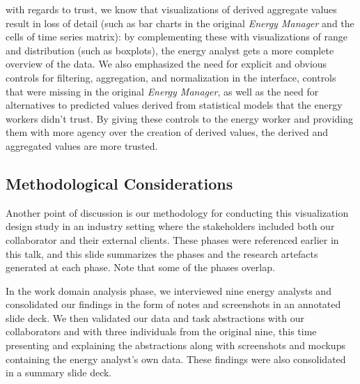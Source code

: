 \documentclass[journal]{vgtc}                %
\newcommand{\bstart}[1]{\vspace{1mm} \noindent{\textbf{#1:}}}
\begin{document}
\bstart{Trust} with regards to trust, we know that visualizations of derived aggregate values result in loss of detail (such as bar charts in the original {\it Energy Manager} and the cells of time series matrix): by complementing these with visualizations of range and distribution (such as boxplots), the energy analyst gets a more complete overview of the data.
We also emphasized the need for explicit and obvious controls for filtering, aggregation, and normalization in the interface, controls that were missing in the original {\it Energy Manager}, as well as the need for alternatives to predicted values derived from statistical models that the energy workers didn't trust. 
By giving these controls to the energy worker and providing them with more agency over the creation of derived values, the derived and aggregated values are more trusted. 


\subsection{Methodological Considerations}
\label{discussion-methodology}


Another point of discussion is our methodology for conducting this visualization design study in an industry setting where the stakeholders included both our collaborator and their external clients. 
These phases were referenced earlier in this talk, and this slide summarizes the phases and the research artefacts generated at each phase. Note that some of the phases overlap.

In the work domain analysis phase, we interviewed nine energy analysts and consolidated our findings in the form of notes and screenshots in an annotated slide deck.
We then validated our data and task abstractions with our collaborators and with three individuals from the original nine, this time presenting and explaining the abstractions along with screenshots and mockups containing the energy analyst's own data. 
These findings were also consolidated in a summary slide deck.
\end{document}
